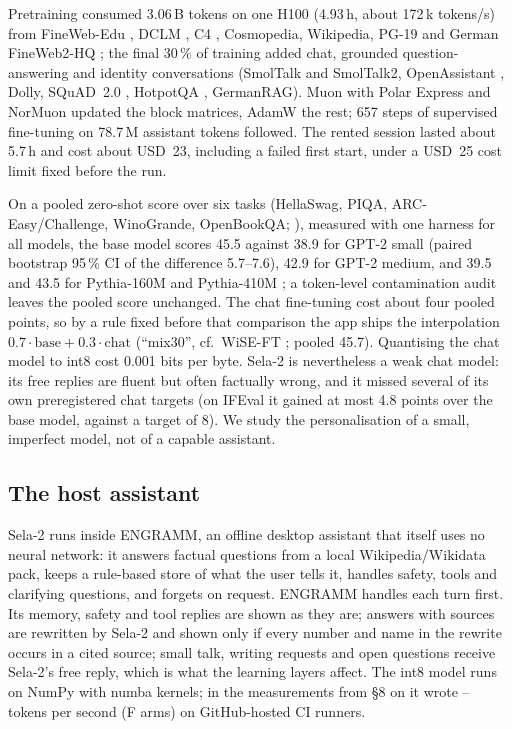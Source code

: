 \documentclass[10pt,twocolumn]{article}
\newcommand{\pct}{\,\%}
\begin{document}
Pretraining consumed 3.06\,B tokens on one H100 (4.93\,h, about 172\,k tokens/s) from FineWeb-Edu
\citep{penedo2024fineweb}, DCLM \citep{li2024dclm}, C4 \citep{raffel2020t5}, Cosmopedia, Wikipedia, PG-19
\citep{rae2020compressive} and German FineWeb2-HQ \citep{messmer2025fineweb2hq}; the final 30\pct{} of training added
chat, grounded question-answering and identity conversations (SmolTalk \citep{allal2025smollm2} and SmolTalk2,
OpenAssistant \citep{kopf2023oasst}, Dolly, SQuAD~2.0 \citep{rajpurkar2018squad2}, HotpotQA \citep{yang2018hotpotqa},
GermanRAG). Muon \citep{jordan2024muon} with Polar Express \citep{amsel2026polar} and NorMuon \citep{li2025normuon}
updated the block matrices, AdamW the rest; 657 steps of supervised fine-tuning on 78.7\,M assistant tokens followed. The
rented session lasted about 5.7\,h and cost about USD~23, including a failed first start, under a USD~25 cost limit fixed
before the run.

On a pooled zero-shot score over six tasks (HellaSwag, PIQA, ARC-Easy/Challenge, WinoGrande, OpenBookQA;
\citealp{zellers2019hellaswag,bisk2020piqa,clark2018arc,sakaguchi2020winogrande,mihaylov2018openbookqa}), measured with
one harness for all models, the base model scores 45.5 against 38.9 for GPT-2 small \citep{radford2019gpt2} (paired
bootstrap 95\pct{} CI of the difference 5.7--7.6), 42.9 for GPT-2 medium, and 39.5 and 43.5 for Pythia-160M and Pythia-410M
\citep{biderman2023pythia}; a token-level contamination audit leaves the pooled score unchanged. The chat fine-tuning
cost about four pooled points, so by a rule fixed before that comparison the app ships the interpolation
$0.7\cdot\text{base} + 0.3\cdot\text{chat}$ (``mix30'', cf.\ WiSE-FT \citep{wortsman2022wiseft}; pooled 45.7).
Quantising the chat model to int8 cost 0.001 bits per byte. Sela-2 is nevertheless a weak chat model: its free replies
are fluent but often factually wrong, and it missed several of its own preregistered chat targets (on IFEval
\citep{zhou2023ifeval} it gained at most 4.8 points over the base model, against a target of 8). We study the
personalisation of a small, imperfect model, not of a capable assistant.

\subsection{The host assistant}\label{sec:host}

Sela-2 runs inside ENGRAMM, an offline desktop assistant that itself uses no neural network: it answers factual
questions from a local Wikipedia/Wikidata pack, keeps a rule-based store of what the user tells it, handles safety,
tools and clarifying questions, and forgets on request. ENGRAMM handles each turn first. Its memory, safety and tool
replies are shown as they are; answers with sources are rewritten by Sela-2 and shown only if every number and name in
the rewrite occurs in a cited source; small talk, writing requests and open questions receive Sela-2's free reply, which
is what the learning layers affect. The int8 model runs on NumPy with numba kernels; in the measurements from \S8 on it wrote
-- tokens per second (F arms) on GitHub-hosted CI runners.
\end{document}
